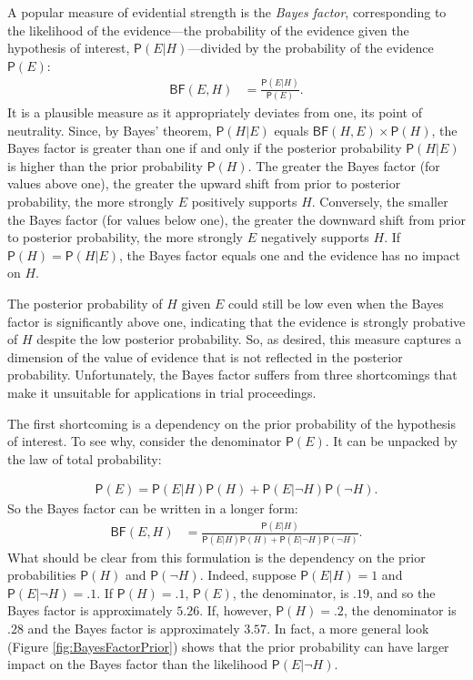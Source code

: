 \documentclass[
  10pt,
  dvipsnames,enabledeprecatedfontcommands]{scrartcl}
\newcommand{\n}{\neg}
\newcommand{\pr}[1]{\mathsf{P}(#1)}
\begin{document}
A popular measure of evidential strength is the \emph{Bayes factor},
corresponding to the likelihood of the evidence---the probability of the
evidence given the hypothesis of interest, \(\pr{E \vert H}\)---divided
by the probability of the evidence \(\pr{E}\): \begin{align*} 
\mathsf{BF}(E,H) & = \frac{\pr{E \vert H}}{\pr{E}}.
\end{align*} \noindent It is a plausible measure as it appropriately
deviates from one, its point of neutrality. Since, by Bayes' theorem,
\(\pr{H \vert E}\) equals \(\mathsf{BF}(H, E) \times \pr{H}\), the Bayes
factor is greater than one if and only if the posterior probability
\(\pr{H \vert E}\) is higher than the prior probability \(\pr{H}\). The
greater the Bayes factor (for values above one), the greater the upward
shift from prior to posterior probability, the more strongly \(E\)
positively supports \(H\). Conversely, the smaller the Bayes factor (for
values below one), the greater the downward shift from prior to
posterior probability, the more strongly \(E\) negatively supports
\(H\). If \(\pr{H}=\pr{H\vert E}\), the Bayes factor equals one and the
evidence has no impact on \(H\).

The posterior probability of \(H\) given \(E\) could still be low even
when the Bayes factor is significantly above one, indicating that the
evidence is strongly probative of \(H\) despite the low posterior
probability. So, as desired, this measure captures a dimension of the
value of evidence that is not reflected in the posterior probability.
Unfortunately, the Bayes factor suffers from three shortcomings that
make it unsuitable for applications in trial proceedings.

The first shortcoming is a dependency on the prior probability of the
hypothesis of interest. To see why, consider the denominator \(\pr{E}\).
It can be unpacked by the law of total probability:

\vspace{-3mm}

\begin{align} \label{eq:lotpSimple}
\pr{E}= \pr{E \vert H} \pr{H}+\pr{E \vert \neg H} \pr{\neg H}.
\end{align} \noindent  So the Bayes factor can be written in a longer
form: \begin{align}\label{eq:BFlotp}
\mathsf{BF}(E,H) & = \frac{\pr{E \vert H}}{\pr{E \vert H} \pr{H}+\pr{E \vert \neg H} \pr{\neg H}}.
\end{align} \noindent What should be clear from this formulation is the
dependency on the prior probabilities \(\pr{H}\) and \(\pr{\neg H}\).
Indeed, suppose \(\pr{E \vert H} = 1\) and \(\pr{E \vert \neg H} = .1\).
If \(\pr{H}=.1\), \(\pr{E}\), the denominator, is \(.19\), and so the
Bayes factor is approximately \(5.26\). If, however, \(\pr{H} =.2\), the
denominator is \(.28\) and the Bayes factor is approximately \(3.57\).
In fact, a more general look (Figure \ref{fig:BayesFactorPrior}) shows
that the prior probability can have larger impact on the Bayes factor
than the likelihood \(\pr{E \vert \n H}\).
\end{document}
